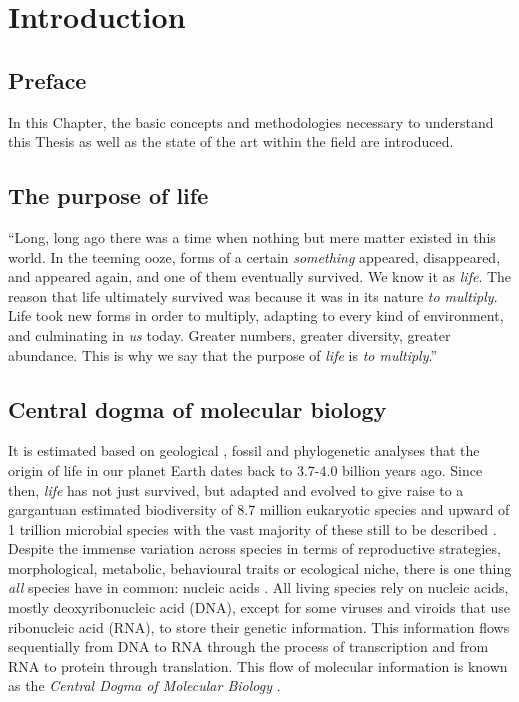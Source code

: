 \chapter{Introduction}

\section*{Preface}

In this Chapter, the basic concepts and methodologies necessary to understand this Thesis as well as the state of the art within the field are introduced.

\section{The purpose of life}

``Long, long ago there was a time when nothing but mere matter existed in this world. In the teeming ooze, forms of a certain \textit{something} appeared, disappeared, and appeared again, and one of them eventually survived. We know it as \textit{life}. The reason that life ultimately survived was because it was in its nature \textit{to multiply}. Life took new forms in order to multiply, adapting to every kind of environment, and culminating in \textit{us} today. Greater numbers, greater diversity, greater abundance. This is why we say that the purpose of \textit{life} is \textit{to multiply}.'' \cite{ISAYAMA_2021}

\section{Central dogma of molecular biology}

It is estimated based on geological \cite{SCHIDLOWSKI_1979_LIFE}, fossil \cite{SCHOPF_2007_LIFE} and phylogenetic \cite{BETTS_2018_LIFE} analyses that the origin of life in our planet Earth dates back to 3.7-4.0 billion years ago. Since then, \textit{life} has not just survived, but adapted and evolved to give raise to a gargantuan estimated biodiversity of 8.7 million eukaryotic species \cite{MORA_2011_SPECIES} and upward of 1 trillion microbial species \cite{HUG_2016_SPECIES, LOCEY_2016_SPECIES} with the vast majority of these still to be described \cite{COSTELLO_2013_SPECIES}. Despite the immense variation across species in terms of reproductive strategies, morphological, metabolic, behavioural traits or ecological niche, there is one thing \textit{all} species have in common: nucleic acids \cite{KOONIN_2011_LIFE}. All living species rely on nucleic acids, mostly deoxyribonucleic acid (DNA), except for some viruses \cite{KOONIN_2006_VIRUS} and viroids \cite{NAVARRO_2021_VIROIDS} that use ribonucleic acid (RNA), to store their genetic information. This information flows sequentially from DNA to RNA through the process of transcription and from RNA to protein through translation. This flow of molecular information is known as the \textit{Central Dogma of Molecular Biology} \cite{CRICK_1958_DOGMA, CRICK_1970_DOGMA}.

